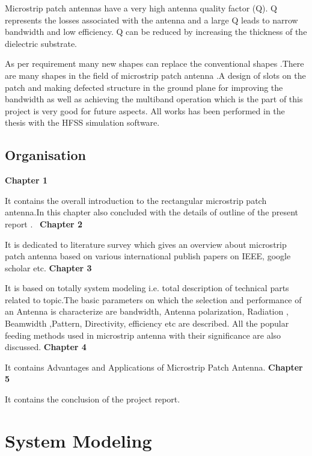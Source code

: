 \documentclass[12pt]{article}
\begin{document}
 \justify
   Microstrip patch antennas have a very high antenna quality factor (Q). Q represents the losses associated with the antenna and a large Q leads to narrow bandwidth and low efficiency. Q can be reduced by increasing the thickness of the dielectric substrate.

 \justify
   As per requirement many new shapes can replace the conventional shapes .There are many shapes in the field of microstrip patch antenna .A design of slots on the patch and making defected structure in the ground plane for improving the bandwidth as well as achieving the multiband operation which is the part of this project is very good for future aspects. All works has been performed in the thesis with the HFSS simulation software.

\cleardoublepage

\subsection{Organisation}\label{sub:Organisation}
 \justify
  \textbf{Chapter 1}

      It contains the overall introduction to the rectangular microstrip patch antenna.In this chapter also concluded with the details of outline of the present report .\
 \justify
  \textbf{Chapter 2}

      It is dedicated to literature survey which gives an overview about microstrip patch antenna based on various international publish papers on IEEE, google scholar etc.
 \justify
  \textbf{Chapter 3}

      It is based on totally system modeling i.e. total description of technical parts related to topic.The basic parameters on which the selection and performance of an Antenna is characterize are bandwidth, Antenna polarization, Radiation , Beamwidth ,Pattern, Directivity, efficiency etc are described. All the popular feeding methods used in microstrip antenna with their significance are also discussed.
 \justify
  \textbf{Chapter 4}

      It contains Advantages and Applications of Microstrip Patch Antenna.
 \justify
  \textbf{Chapter 5}

      It contains the conclusion of the project report.


%
\cleardoublepage
 
\section{System Modeling}\label{sec:System Modeling}
\end{document}
